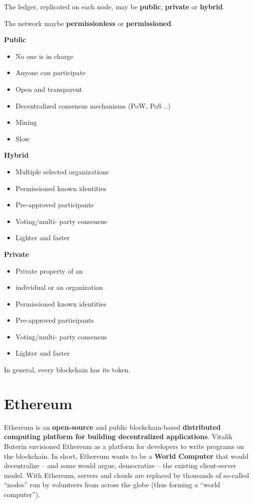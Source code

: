 The ledger, replicated on each node, may be \textbf{public}, \textbf{private} or \textbf{hybrid}.

The network maybe \textbf{permissionless} or \textbf{permissioned}.

\textbf{Public}
\begin{itemize}
	\item No one is in charge
	\item Anyone can participate 
	\item Open and transparent
	\item Decentralized consensus mechanisms (PoW, PoS ..)
	\item Mining
	\item Slow
\end{itemize}

\textbf{Hybrid}
\begin{itemize}
	\item Multiple selected organizations
	\item Permissioned known identities
	\item Pre-approved participants
	\item Voting/multi- party consensus
	\item Lighter and faster
\end{itemize}

\textbf{Private}
\begin{itemize}
	\item Private property of an
	\item individual or an organization
	\item Permissioned known identities
	\item Pre-approved participants
	\item Voting/multi- party consensus
	\item Lighter and faster
\end{itemize}


In general, every blockchain has its token.
\section{Ethereum}

Ethereum is an \textbf{open-source} and public blockchain-based \textbf{distributed computing platform for building decentralized applications}. Vitalik Buterin envisioned Ethereum as a platform for developers to write programs on the blockchain. In short, Ethereum wants to be a \textbf{World Computer} that would decentralize – and some would argue, democratize – the existing client-server model. With Ethereum, servers and clouds are replaced by thousands of so-called ``nodes'' run by volunteers from across the globe (thus forming a ``world computer'').

